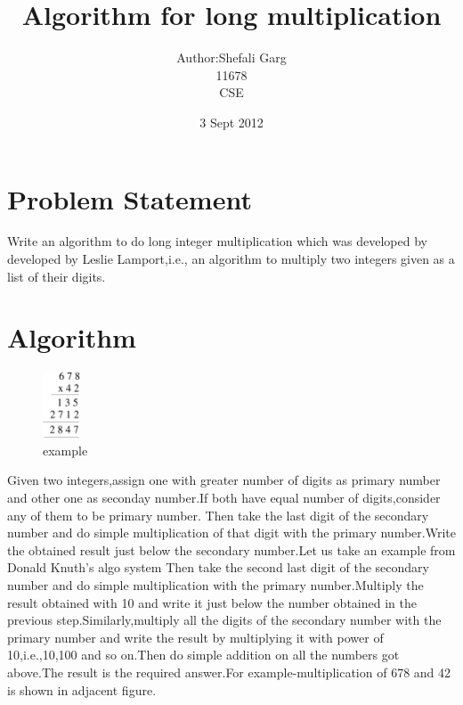 \documentclass[12pt]{article}
\begin{document}
\title{Algorithm for long multiplication}
\author{Author:Shefali Garg\\11678\\CSE}
\date{3 Sept 2012}
\maketitle
\tableofcontents
\section{Problem Statement}


Write an algorithm to do long integer multiplication which was developed by developed by Leslie
Lamport\cite{lamport94},i.e., an algorithm to multiply two integers given as a list of their digits.

\section{Algorithm}
\begin{figure}
  \vspace{-2pt}
  \begin{center}
    \includegraphics[width=0.1\textwidth]{mult2}
  \end{center}
  \vspace{-10pt}
  \caption{example}
  \vspace{-20pt}
\end{figure}
Given two integers,assign one with greater number of digits as primary number and other one as seconday number.If both have equal number of digits,consider any of them to be primary number.
Then take the last digit of the secondary number and do simple multiplication of that digit with the primary number.Write the obtained result just below the secondary number.Let us take an example from Donald Knuth's algo system\cite{knuth79} 
Then take the second last digit of the secondary number and do simple multiplication with the primary number.Multiply the result obtained with 10 and write it just below the number obtained in the previous step.Similarly,multiply all the digits of the secondary number with the primary number and write the result by multiplying it with power of 10,i.e.,10,100 and so on.Then do simple addition on all the numbers got above.The result is the required answer.For example-multiplication of 678 and 42 is shown in adjacent figure.
\end{document}
